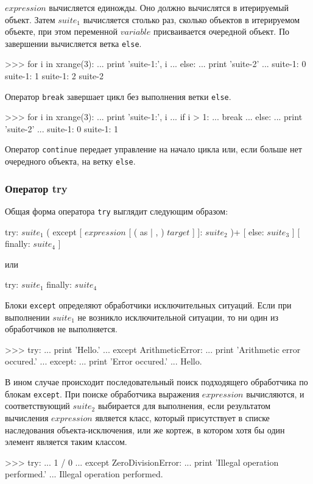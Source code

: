 $expression$ вычисляется единожды. Оно должно вычислятся в итерируемый объект. Затем $suite_1$ вычисляется столько раз, сколько объектов в итерируемом объекте, при этом переменной $variable$ присваивается очередной объект. По завершении вычисляется ветка \lstinline{else}.
\begin{pylst}{}{}
>>> for i in xrange(3):
...     print 'suite-1:', i
... else:
...     print 'suite-2'
...
suite-1: 0
suite-1: 1
suite-1: 2
suite-2
\end{pylst}

Оператор \lstinline{break} завершает цикл без выполнения ветки \lstinline{else}.
\begin{pylst}{}{}
>>> for i in xrange(3):
...     print 'suite-1:', i
...     if i > 1:
...         break
... else:
...     print 'suite-2'
...
suite-1: 0
suite-1: 1
\end{pylst}

Оператор \lstinline{continue} передает управление на начало цикла или, если больше нет очередного объекта, на ветку \lstinline{else}.

\subsubsection{Оператор try}
Общая форма оператора \lstinline{try} выглядит следующим образом:
\begin{pylst}{}{}
try: $suite_1$
( except [ $expression$ [ ( as | , ) $target$ ] ]: $suite_2$ )+
[ else: $suite_3$ ]
[ finally: $suite_4$ ]
\end{pylst}
или
\begin{pylst}{}{}
try: $suite_1$
finally: $suite_4$
\end{pylst}

Блоки \lstinline{except} определяют обработчики исключительных ситуаций. Если при выполнении $suite_1$ не возникло исключительной ситуации, то ни один из обработчиков не выполняется.
\begin{pylst}{}{}
>>> try:
...     print 'Hello.'
... except ArithmeticError:
...     print 'Arithmetic error occured.'
... except:
...     print 'Error occured.'
...
Hello.
\end{pylst}

В ином случае происходит последовательный поиск подходящего обработчика по блокам \lstinline{except}. При поиске обработчика выражения $expression$ вычисляются, и соответствующий $suite_2$ выбирается для выполнения, если результатом вычисления $expression$ является класс, который присутствует в списке наследования объекта-исключения, или же кортеж, в котором хотя бы один элемент является таким классом.
\begin{pylst}{}{}
>>> try:
...     1 / 0
... except ZeroDivisionError:
...     print 'Illegal operation performed.'
...
Illegal operation performed.
\end{pylst}

